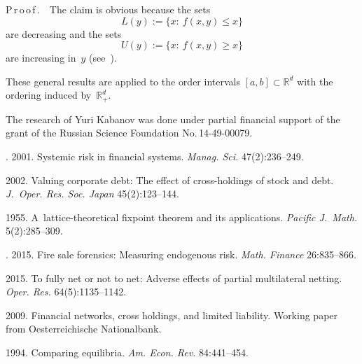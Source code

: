 \begin{multicols}{2}
{\noindent
P\,r\,o\,o\,f\,.\ \ The claim is obvious because the sets   
$$
L(y):=\{x:\  f(x,y)\le x\}
$$ 
are decreasing and the sets 
$$
U(y):=\{x:\ f(x,y)\ge x\}$$ 
are increasing in~$y$
(see~\cite{Milgrom-Roberts}).

These general results are applied to the order intervals $[a,b]\subset \mathbb{R}^d$
with the ordering induced by~$\mathbb{R}^d_+$.

}

\vspace*{-6pt}

\Ack
\noindent
The 
research of Yuri Kabanov was done under partial financial support   of the grant 
of  the Russian Science Foundation No.\,14-49-00079.


\renewcommand{\bibname}{\protect\rmfamily References}

\vspace*{-6pt}

{\small\frenchspacing
{%
\begin{thebibliography}{9}

. 2001. Systemic risk in financial systems. 
\textit{Manag. Sci.} 47(2):236--249.

 2002. Valuing corporate debt: The effect of cross-holdings of stock 
and debt. \textit{J.~Oper. Res. Soc. Japan} 45(2):123--144.

 1955. A~lattice-theoretical fixpoint theorem and its applications. 
\textit{Pacific J.~Math.} 5(2):285--309.


. 2015. Fire sale forensics: Measuring endogenous risk. 
\textit{Math. Finance} 26:835--866. %

 2015. To fully net or not to net: Adverse 
effects of partial multilateral netting. %
\textit{Oper. Res.} 64(5):1135--1142.

 2009. Financial networks, cross holdings, and limited liability. 
Working paper from Oesterreichische Nationalbank.

 1994. Comparing equilibria. 
\textit{Am. Econ. Rev.}  84:441--454.




\end{thebibliography} } }

\end{multicols}


